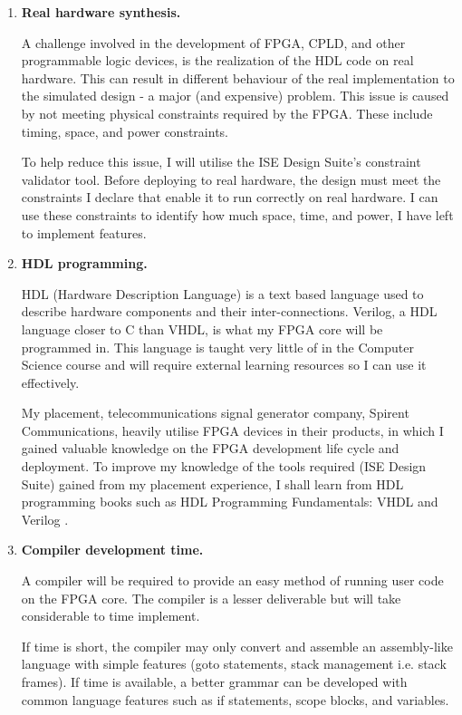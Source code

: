 \begin{enumerate}[label=\bfseries R\arabic*.]
\item{
\textbf{Real hardware synthesis. }

A challenge involved in the development of FPGA, CPLD, and other programmable logic devices, is the realization of the HDL code on real hardware. This can result in different behaviour of the real implementation to the simulated design - a major (and expensive) problem. This issue is caused by not meeting physical constraints required by the FPGA. These include timing, space, and power constraints.

To help reduce this issue, I will utilise the ISE Design Suite's constraint validator tool. Before deploying to real hardware, the design must meet the constraints I declare that enable it to run correctly on real hardware. I can use these constraints to identify how much space, time, and power, I have left to implement features.
}\label{risk:hw}
\item{
\textbf{HDL programming.} 

HDL (Hardware Description Language) is a text based language used to describe hardware components and their inter-connections. Verilog, a HDL language closer to C than VHDL, is what my FPGA core will be programmed in. This language is taught very little of in the Computer Science course and will require external learning resources so I can use it effectively. 

My placement,  telecommunications signal generator company, Spirent Communications, heavily utilise FPGA devices in their products, in which I gained valuable knowledge on the FPGA development life cycle and deployment. To improve my knowledge of the tools required (ISE Design Suite) gained from my placement experience, I shall learn from HDL programming books such as HDL Programming Fundamentals: VHDL and Verilog \citep{hdl}.
}

\item{\textbf{Compiler development time. }

A compiler will be required to provide an easy method of running user code on the FPGA core. The compiler is a lesser deliverable but will take considerable to time implement.

If time is short, the compiler may only convert and assemble an assembly-like language with simple features (goto statements, stack management i.e. stack frames). If time is available, a better grammar can be developed with common language features such as if statements, scope blocks, and variables.

}
\end{enumerate}
